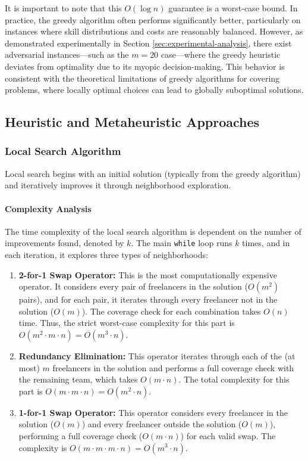 \documentclass[12pt,a4paper]{article}
\begin{document}
It is important to note that this $O(\log n)$ guarantee is a worst-case bound. In practice, the greedy algorithm often performs significantly better, particularly on instances where skill distributions and costs are reasonably balanced. However, as demonstrated experimentally in Section \ref{sec:experimental-analysis}, there exist adversarial instances---such as the $m=20$ case---where the greedy heuristic deviates from optimality due to its myopic decision-making. This behavior is consistent with the theoretical limitations of greedy algorithms for covering problems, where locally optimal choices can lead to globally suboptimal solutions.

\subsection{Heuristic and Metaheuristic Approaches}
\label{subsec:heuristics}

\subsubsection{Local Search Algorithm}
Local search begins with an initial solution (typically from the greedy algorithm) and iteratively improves it through neighborhood exploration.

\paragraph{Complexity Analysis} 

The time complexity of the local search algorithm is dependent on the number of improvements found, denoted by $k$. The main \texttt{while} loop runs $k$ times, and in each iteration, it explores three types of neighborhoods:

\begin{enumerate}
    \item \textbf{2-for-1 Swap Operator:} This is the most computationally expensive operator. It considers every pair of freelancers in the solution ($O(m^2)$ pairs), and for each pair, it iterates through every freelancer not in the solution ($O(m)$). The coverage check for each combination takes $O(n)$ time. Thus, the strict worst-case complexity for this part is $O(m^2 \cdot m \cdot n) = O(m^3 \cdot n)$.
    \item \textbf{Redundancy Elimination:} This operator iterates through each of the (at most) $m$ freelancers in the solution and performs a full coverage check with the remaining team, which takes $O(m \cdot n)$. The total complexity for this part is $O(m \cdot m \cdot n) = O(m^2 \cdot n)$.
    \item \textbf{1-for-1 Swap Operator:} This operator considers every freelancer in the solution ($O(m)$) and every freelancer outside the solution ($O(m)$), performing a full coverage check ($O(m \cdot n)$) for each valid swap. The complexity is $O(m \cdot m \cdot m \cdot n) = O(m^3 \cdot n)$.
\end{enumerate}
\end{document}

